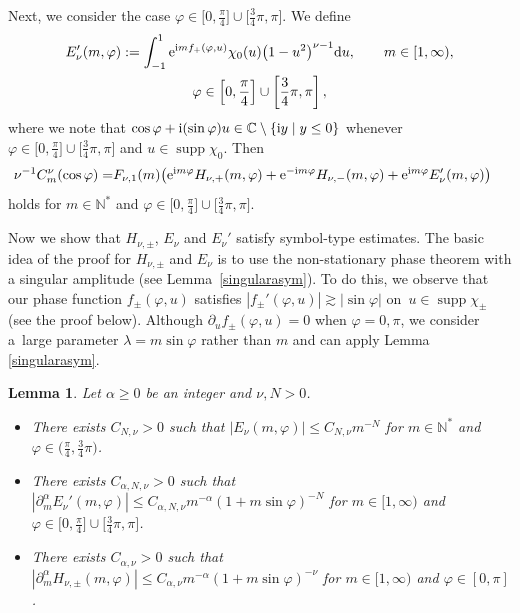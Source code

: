 \documentclass[10pt,a4paper]{amsart}
\numberwithin{equation}{section}
\newtheorem{Lemma}[Theorem]{Lemma}
\DeclareMathOperator{\supp}{supp}%
\def\a{\alpha}
\def\f{\varphi}
\def\l{\lambda}
\def\n{\nu}
\def\pa{\partial}
\begin{document}
Next, we consider the case $\f\in \bigl[0,\frac{\pi}{4}\bigr]\cup \bigl[\frac{3}{4}\pi,\pi\bigr]$. We define
\begin{gather*}
E_{\n}'(m,\f):=\int_{-1}^1{\rm e}^{{\rm i}mf_{+}(\f,u)}\chi_{0}(u)\bigl(1-u^2\bigr)^{\n-1}{\rm d}u,\qquad m\in [1,\infty),\\ \f\in \left[0,\frac{\pi}{4}\right]\cup \left[\frac{3}{4}\pi,\pi\right],
\end{gather*}
where we note that $\cos \f+{\rm i}(\sin\f)u\in \mathbb{C}\setminus \{{\rm i}y\mid y\leq 0\}$ whenever $\f\in \bigl[0,\frac{\pi}{4}\bigr]\cup \bigl[\frac{3}{4}\pi,\pi\bigr]$ and $u\in \supp \chi_0$. Then
\begin{align}\label{Gegendecom2}
\n^{-1}C_m^{\n}(\cos\f)=&F_{\n,1}(m)\bigl({\rm e}^{{\rm i}m\f}H_{\n,+}(m,\f)+{\rm e}^{-{\rm i}m\f}H_{\n,-}(m,\f)+{\rm e}^{{\rm i}m\f}E_{\n}'(m,\f) \bigr)
\end{align}
holds for $m\in\mathbb{N}^*$ and $\f\in \bigl[0,\frac{\pi}{4}\bigr]\cup \bigl[\frac{3}{4}\pi,\pi\bigr]$.

Now we show that $H_{\n,\pm}$, $E_{\n}$ and $E_{\n}'$ satisfy symbol-type estimates. The basic idea of the proof for $H_{\n,\pm}$ and $E_{\n}$ is to use the non-stationary phase theorem with a singular amplitude (see Lemma~\ref{singularasym}). To do this, we observe that our phase function $f_{\pm}(\f,u)$ satisfies $|f_{\pm}'(\f,u)|\gtrsim |\sin \f|$ on~${u\in \supp \chi_{\pm}}$ (see the proof below). Although $\pa_u f_{\pm}(\f,u)=0$ when $\f=0,\pi$, we consider a~large parameter $\l=m\sin \f$ rather than $m$ and can apply Lemma \ref{singularasym}.

\begin{Lemma}\label{Gegenlemma}
Let $\a\geq 0$ be an integer and $\n,N>0$.
\begin{itemize}\itemsep=0pt
\item[$(i)$] There exists $C_{N,\n}>0$ such that $|E_{\n}(m,\f)|\leq C_{N,\n}m^{-N}$ for $m\in\mathbb{N}^*$ and $\f\in \bigl(\frac{\pi}{4}, \frac{3}{4}\pi\bigr)$.

\item[$(ii)$] There exists $C_{\a,N,\n}>0$ such that $|\pa_{m}^{\a}E_{\n}'(m,\f)|\leq C_{\a,N,\n}m^{-\a}(1+m\sin\f)^{-N}$ for $m\in[1,\infty)$ and $\f\in \bigl[0,\frac{\pi}{4}\bigr]\cup \bigl[\frac{3}{4}\pi,\pi\bigr]$.

\item[$(iii)$] There exists $C_{\a,\n}>0$ such that $|\pa_{m}^{\a}H_{\n,\pm}(m,\f)|\leq C_{\a,\n}m^{-\a}(1+m\sin\f)^{-\n}$ for $m\in[1,\infty)$ and $\f\in [0,\pi]$.
\end{itemize}
\end{Lemma}
\end{document}

